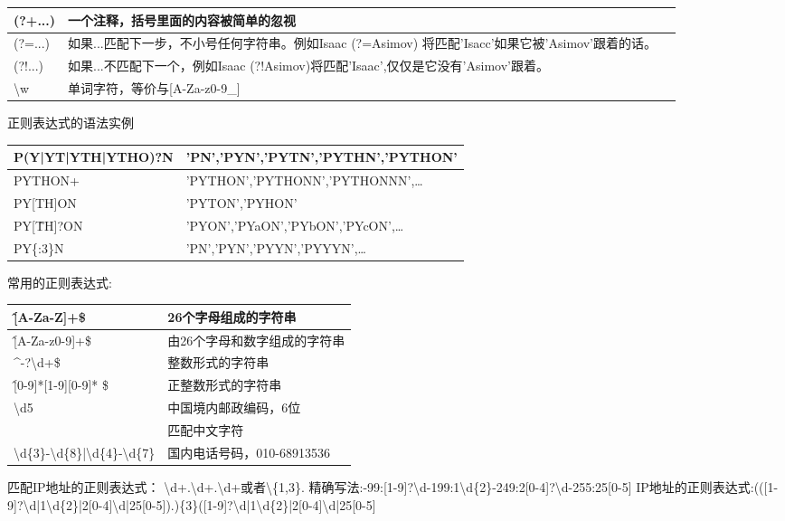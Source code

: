 \documentclass{book}
\begin{document}
\begin{center}
\begin{tabular}{|p{3cm}|p{10cm}|p{4cm}|}
\hline
(?+...)&一个注释，括号里面的内容被简单的忽视&\\
\hline
(?=...)&如果...匹配下一步，不小号任何字符串。例如Isaac (?=Asimov) 将匹配'Isacc'如果它被'Asimov'跟着的话。&\\
\hline
(?!...)&如果...不匹配下一个，例如Isaac (?!Asimov)将匹配'Isaac',仅仅是它没有'Asimov'跟着。&\\
\hline
\textbackslash w&单词字符，等价与[A-Za-z0-9\_]&\\
\hline
\end{tabular}
\end{center}
正则表达式的语法实例
\begin{center}
\begin{tabular}{|p{6cm}|p{8cm}|}
\hline
P(Y|YT|YTH|YTHO)?N&'PN','PYN','PYTN','PYTHN','PYTHON'\\
\hline
PYTHON+&'PYTHON','PYTHONN','PYTHONNN',\ldots\\
\hline
PY[TH]ON&'PYTON','PYHON'\\
\hline
PY[\^TH]?ON&'PYON','PYaON','PYbON','PYcON',\ldots\\
\hline
PY\{:3\}N&'PN','PYN','PYYN','PYYYN',\ldots\\
\hline
\end{tabular}
\end{center}
常用的正则表达式:
\begin{center}
\begin{tabular}{||l|l||}
\hline
\^[A-Za-Z]+\$ &26个字母组成的字符串\\
\hline
\^[A-Za-z0-9]+\$&由26个字母和数字组成的字符串\\
\hline
\^\quad-?\textbackslash d+\$&整数形式的字符串\\
\hline
\^[0-9]*[1-9][0-9]* \$&正整数形式的字符串\\
\hline
[1-9]\textbackslash d{5}&中国境内邮政编码，6位\\
\hline
[\textbackslash u4e00-\textbackslash u9fa5]&匹配中文字符\\
\hline
\textbackslash d\{3\}-\textbackslash d\{8\}|\textbackslash d\{4\}-\textbackslash d\{7\}&国内电话号码，010-68913536\\
\hline

\end{tabular}
\end{center}
匹配IP地址的正则表达式：
\textbackslash d+.\textbackslash d+.\textbackslash d+或者\textbackslash\{1,3\}.
精确写法:-99:[1-9]?\textbackslash d-199:1\textbackslash d\{2\}-249:2[0-4]?\textbackslash d-255:25[0-5]\newline
IP地址的正则表达式:(([1-9]?\textbackslash d|1\textbackslash d\{2\}|2[0-4]\textbackslash d|25[0-5]).)\{3\}([1-9]?\textbackslash d|1\textbackslash d\{2\}|2[0-4]\textbackslash d|25[0-5]
\end{document}
